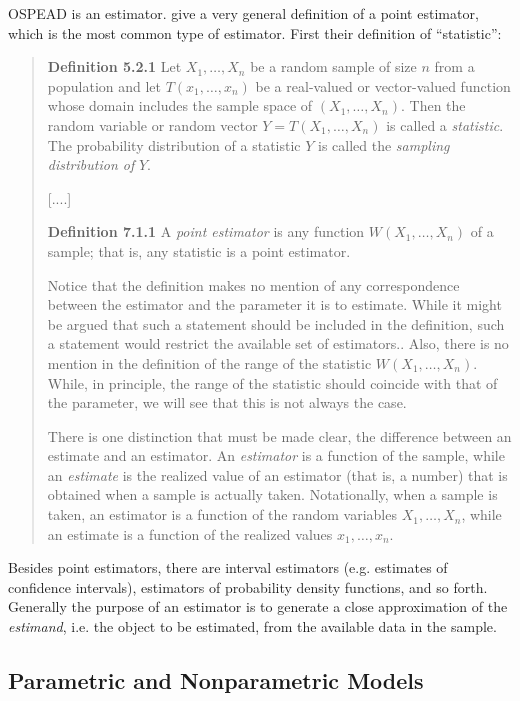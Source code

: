 \documentclass[english]{article}
\begin{document}
OSPEAD is an estimator. \cite{CasellaBerger2002} give a very general
definition of a point estimator, which is the most common type of
estimator. First their definition of ``statistic'':
\begin{quote}
\textbf{Definition 5.2.1} Let $X_{1},\dots,X_{n}$ be a random sample
of size $n$ from a population and let $T(x_{1},\dots,x_{n})$ be
a real-valued or vector-valued function whose domain includes the
sample space of $(X_{1},\dots,X_{n})$. Then the random variable or
random vector $Y=T(X_{1},\dots,X_{n})$ is called a \textit{statistic}.
The probability distribution of a statistic $Y$ is called the \textit{sampling
distribution of }$Y$.

{[}....{]}

\textbf{Definition 7.1.1} A \textit{point estimator} is any function
$W(X_{1},\dots,X_{n})$ of a sample; that is, any statistic is a point
estimator.

Notice that the definition makes no mention of any correspondence
between the estimator and the parameter it is to estimate. While it
might be argued that such a statement should be included in the definition,
such a statement would restrict the available set of estimators..
Also, there is no mention in the definition of the range of the statistic
$W(X_{1},\dots,X_{n})$. While, in principle, the range of the statistic
should coincide with that of the parameter, we will see that this
is not always the case.

There is one distinction that must be made clear, the difference between
an estimate and an estimator. An \textit{estimator} is a function
of the sample, while an \textit{estimate} is the realized value of
an estimator (that is, a number) that is obtained when a sample is
actually taken. Notationally, when a sample is taken, an estimator
is a function of the random variables $X_{1},\dots,X_{n}$, while
an estimate is a function of the realized values $x_{1},\dots,x_{n}$.
\end{quote}
Besides point estimators, there are interval estimators (e.g. estimates
of confidence intervals), estimators of probability density functions,
and so forth. Generally the purpose of an estimator is to generate
a close approximation of the \textit{estimand}, i.e. the object to
be estimated, from the available data in the sample.

\subsection{Parametric and Nonparametric Models}
\end{document}
